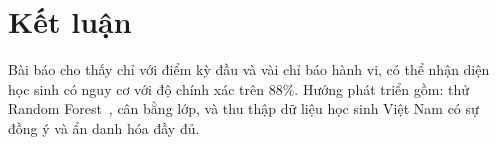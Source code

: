\documentclass[runningheads]{llncs}
\begin{document}
\section{Kết luận}\label{sec:conclusion}
Bài báo cho thấy chỉ với điểm kỳ đầu và vài chỉ báo hành vi, có thể nhận diện học sinh có
nguy cơ với độ chính xác trên 88\%. Hướng phát triển gồm: thử Random Forest~\cite{breiman2001},
cân bằng lớp, và thu thập dữ liệu học sinh Việt Nam có sự đồng ý và ẩn danh hóa đầy đủ.



\end{document}
